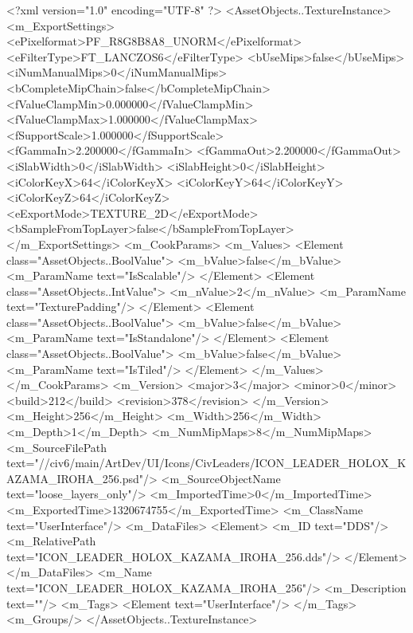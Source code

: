 <?xml version="1.0" encoding="UTF-8" ?>
<AssetObjects..TextureInstance>
	<m_ExportSettings>
		<ePixelformat>PF_R8G8B8A8_UNORM</ePixelformat>
		<eFilterType>FT_LANCZOS6</eFilterType>
		<bUseMips>false</bUseMips>
		<iNumManualMips>0</iNumManualMips>
		<bCompleteMipChain>false</bCompleteMipChain>
		<fValueClampMin>0.000000</fValueClampMin>
		<fValueClampMax>1.000000</fValueClampMax>
		<fSupportScale>1.000000</fSupportScale>
		<fGammaIn>2.200000</fGammaIn>
		<fGammaOut>2.200000</fGammaOut>
		<iSlabWidth>0</iSlabWidth>
		<iSlabHeight>0</iSlabHeight>
		<iColorKeyX>64</iColorKeyX>
		<iColorKeyY>64</iColorKeyY>
		<iColorKeyZ>64</iColorKeyZ>
		<eExportMode>TEXTURE_2D</eExportMode>
		<bSampleFromTopLayer>false</bSampleFromTopLayer>
	</m_ExportSettings>
	<m_CookParams>
		<m_Values>
			<Element class="AssetObjects..BoolValue">
				<m_bValue>false</m_bValue>
				<m_ParamName text="IsScalable"/>
			</Element>
			<Element class="AssetObjects..IntValue">
				<m_nValue>2</m_nValue>
				<m_ParamName text="TexturePadding"/>
			</Element>
			<Element class="AssetObjects..BoolValue">
				<m_bValue>false</m_bValue>
				<m_ParamName text="IsStandalone"/>
			</Element>
			<Element class="AssetObjects..BoolValue">
				<m_bValue>false</m_bValue>
				<m_ParamName text="IsTiled"/>
			</Element>
		</m_Values>
	</m_CookParams>
	<m_Version>
		<major>3</major>
		<minor>0</minor>
		<build>212</build>
		<revision>378</revision>
	</m_Version>
	<m_Height>256</m_Height>
	<m_Width>256</m_Width>
	<m_Depth>1</m_Depth>
	<m_NumMipMaps>8</m_NumMipMaps>
	<m_SourceFilePath text="//civ6/main/ArtDev/UI/Icons/CivLeaders/ICON_LEADER_HOLOX_KAZAMA_IROHA_256.psd"/>
	<m_SourceObjectName text="loose_layers_only"/>
	<m_ImportedTime>0</m_ImportedTime>
	<m_ExportedTime>1320674755</m_ExportedTime>
	<m_ClassName text="UserInterface"/>
	<m_DataFiles>
		<Element>
			<m_ID text="DDS"/>
			<m_RelativePath text="ICON_LEADER_HOLOX_KAZAMA_IROHA_256.dds"/>
		</Element>
	</m_DataFiles>
	<m_Name text="ICON_LEADER_HOLOX_KAZAMA_IROHA_256"/>
	<m_Description text=""/>
	<m_Tags>
		<Element text="UserInterface"/>
	</m_Tags>
	<m_Groups/>
</AssetObjects..TextureInstance>

